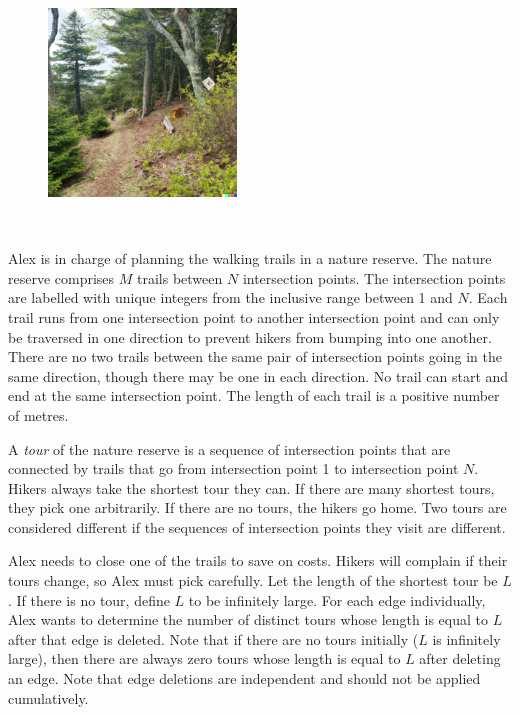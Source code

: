 
\begin{figure}
 \includegraphics[width=50mm]{img.png}
\end{figure}
~

Alex is in charge of planning the walking trails in a nature reserve. The nature reserve comprises $M$ trails between $N$ intersection points. The intersection points are labelled with unique integers from the inclusive range between 1 and $N$. Each trail runs from one intersection point to another intersection point and can only be traversed in one direction to prevent hikers from bumping into one another. There are no two trails between the same pair of intersection points going in the same direction, though there may be one in each direction. No trail can start and end at the same intersection point. The length of each trail is a positive number of metres.

A \textit{tour} of the nature reserve is a sequence of intersection points that are connected by trails that go from intersection point 1 to intersection point $N$. Hikers always take the shortest tour they can. If there are many shortest tours, they pick one arbitrarily. If there are no tours, the hikers go home. Two tours are considered different if the sequences of intersection points they visit are different.

Alex needs to close one of the trails to save on costs. Hikers will complain if their tours change, so Alex must pick carefully. Let the length of the shortest tour be $L$. If there is no tour, define $L$ to be infinitely large. For each edge individually, Alex wants to determine the number of distinct tours whose length is equal to $L$ after that edge is deleted. Note that if there are no tours initially ($L$ is infinitely large), then there are always zero tours whose length is equal to $L$ after deleting an edge. Note that edge deletions are independent and should not be applied cumulatively.



